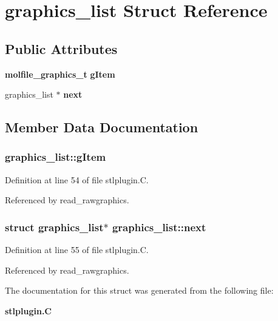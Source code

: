 \section{graphics\_\-list  Struct Reference}
\label{structgraphics__list}
\subsection*{Public Attributes}
\begin{CompactItemize}
\item 
{\bf molfile\_\-graphics\_\-t} {\bf g\-Item}
\item 
graphics\_\-list $\ast$ {\bf next}
\end{CompactItemize}


\subsection{Member Data Documentation}
\subsubsection{ graphics\_\-list::g\-Item}\label{structgraphics__list_m0}




Definition at line 54 of file stlplugin.C.

Referenced by read\_\-rawgraphics.
\subsubsection{\setlength{\rightskip}{0pt plus 5cm}struct graphics\_\-list$\ast$ graphics\_\-list::next}\label{structgraphics__list_m1}




Definition at line 55 of file stlplugin.C.

Referenced by read\_\-rawgraphics.

The documentation for this struct was generated from the following file:\begin{CompactItemize}
\item 
{\bf stlplugin.C}\end{CompactItemize}
